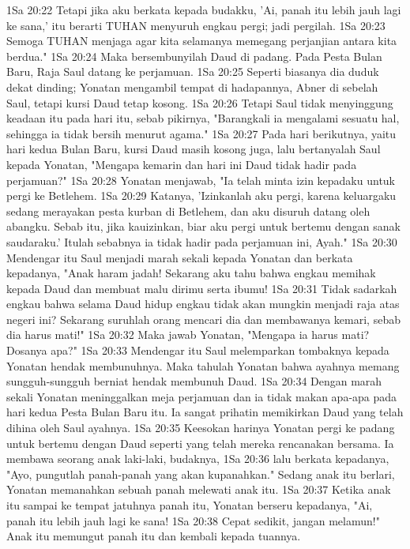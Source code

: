 1Sa 20:22  Tetapi jika aku berkata kepada budakku, 'Ai, panah itu lebih jauh lagi ke sana,' itu berarti TUHAN menyuruh engkau pergi; jadi pergilah.
1Sa 20:23  Semoga TUHAN menjaga agar kita selamanya memegang perjanjian antara kita berdua."
1Sa 20:24  Maka bersembunyilah Daud di padang. Pada Pesta Bulan Baru, Raja Saul datang ke perjamuan.
1Sa 20:25  Seperti biasanya dia duduk dekat dinding; Yonatan mengambil tempat di hadapannya, Abner di sebelah Saul, tetapi kursi Daud tetap kosong.
1Sa 20:26  Tetapi Saul tidak menyinggung keadaan itu pada hari itu, sebab pikirnya, "Barangkali ia mengalami sesuatu hal, sehingga ia tidak bersih menurut agama."
1Sa 20:27  Pada hari berikutnya, yaitu hari kedua Bulan Baru, kursi Daud masih kosong juga, lalu bertanyalah Saul kepada Yonatan, "Mengapa kemarin dan hari ini Daud tidak hadir pada perjamuan?"
1Sa 20:28  Yonatan menjawab, "Ia telah minta izin kepadaku untuk pergi ke Betlehem.
1Sa 20:29  Katanya, 'Izinkanlah aku pergi, karena keluargaku sedang merayakan pesta kurban di Betlehem, dan aku disuruh datang oleh abangku. Sebab itu, jika kauizinkan, biar aku pergi untuk bertemu dengan sanak saudaraku.' Itulah sebabnya ia tidak hadir pada perjamuan ini, Ayah."
1Sa 20:30  Mendengar itu Saul menjadi marah sekali kepada Yonatan dan berkata kepadanya, "Anak haram jadah! Sekarang aku tahu bahwa engkau memihak kepada Daud dan membuat malu dirimu serta ibumu!
1Sa 20:31  Tidak sadarkah engkau bahwa selama Daud hidup engkau tidak akan mungkin menjadi raja atas negeri ini? Sekarang suruhlah orang mencari dia dan membawanya kemari, sebab dia harus mati!"
1Sa 20:32  Maka jawab Yonatan, "Mengapa ia harus mati? Dosanya apa?"
1Sa 20:33  Mendengar itu Saul melemparkan tombaknya kepada Yonatan hendak membunuhnya. Maka tahulah Yonatan bahwa ayahnya memang sungguh-sungguh berniat hendak membunuh Daud.
1Sa 20:34  Dengan marah sekali Yonatan meninggalkan meja perjamuan dan ia tidak makan apa-apa pada hari kedua Pesta Bulan Baru itu. Ia sangat prihatin memikirkan Daud yang telah dihina oleh Saul ayahnya.
1Sa 20:35  Keesokan harinya Yonatan pergi ke padang untuk bertemu dengan Daud seperti yang telah mereka rencanakan bersama. Ia membawa seorang anak laki-laki, budaknya,
1Sa 20:36  lalu berkata kepadanya, "Ayo, pungutlah panah-panah yang akan kupanahkan." Sedang anak itu berlari, Yonatan memanahkan sebuah panah melewati anak itu.
1Sa 20:37  Ketika anak itu sampai ke tempat jatuhnya panah itu, Yonatan berseru kepadanya, "Ai, panah itu lebih jauh lagi ke sana!
1Sa 20:38  Cepat sedikit, jangan melamun!" Anak itu memungut panah itu dan kembali kepada tuannya.
